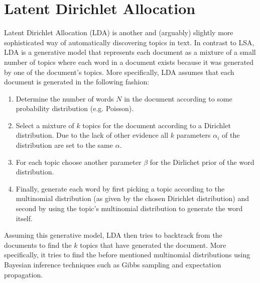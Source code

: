\section{Latent Dirichlet Allocation}

Latent Dirichlet Allocation (LDA) is another and (arguably) slightly more sophisticated way of automatically discovering topics in text. In contrast to LSA, LDA is a generative model that represents each document as a mixture of a small number of topics where each word in a document exists because it was generated by one of the document's topics. More specifically, LDA assumes that each document is generated in the following fashion:

\begin{enumerate}
    \item Determine the number of words $N$ in the document according to some probability distribution (e.g. Poisson).
    \item Select a mixture of $k$ topics for the document according to a Dirichlet distribution. Due to the lack of other evidence all $k$ parameters $\alpha_{i}$ of the distribution are set to the same $\alpha$.
    \item For each topic choose another parameter $\beta$ for the Dirlichet prior of the word distribution.
    \item Finally, generate each word by first picking a topic according to the multinomial distribution (as given by the chosen Dirichlet distribution) and second by using the topic's multinomial distribution to generate the word itself.
\end{enumerate}

Assuming this generative model, LDA then tries to backtrack from the documents to find the $k$ topics that have generated the document. More specifically, it tries to find the before mentioned multinomial distributions using Bayesian inference techniques such as Gibbs sampling and expectation propagation.
